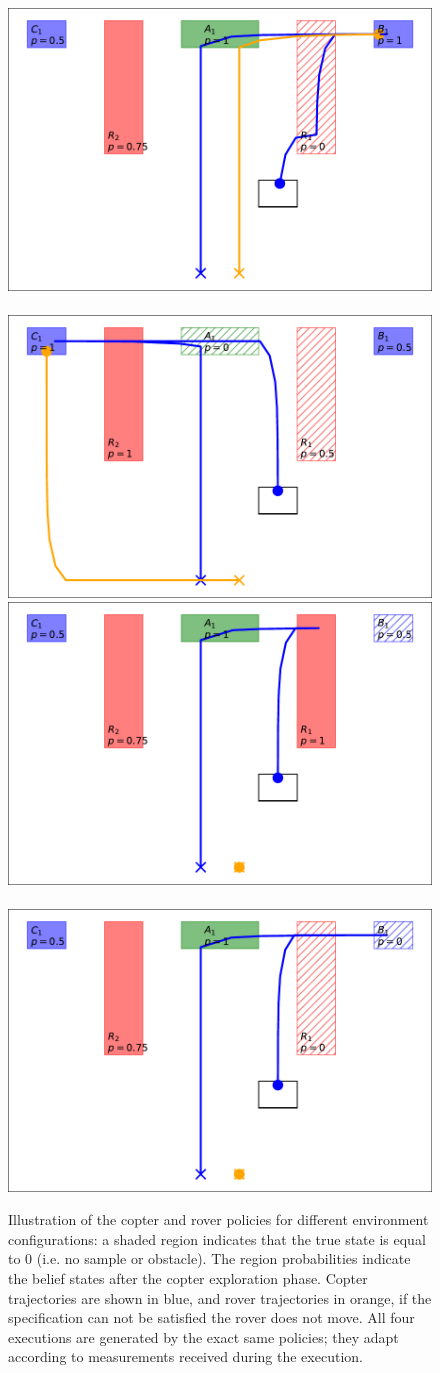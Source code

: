 \documentclass[conference]{IEEEtran}
\begin{document}
\begin{figure}
	\begin{center}
	\includegraphics[width=0.4\columnwidth]{2figs/exp0-map.pdf} ~
	\includegraphics[width=0.4\columnwidth]{2figs/exp1-map.pdf} \\
	\vspace{1mm}
	\includegraphics[width=0.4\columnwidth]{2figs/exp2-map.pdf} ~
	\includegraphics[width=0.4\columnwidth]{2figs/exp3-map.pdf}
	\end{center}
	\caption{Illustration of the copter and rover policies for different environment configurations: a shaded region indicates that the true state is equal to 0 (i.e. no sample or obstacle). The region probabilities indicate the belief states after the copter exploration phase. Copter trajectories are shown in blue, and rover trajectories in orange, if the specification can not be satisfied the rover does not move. All four executions are generated by the exact same policies; they adapt according to measurements received during the execution.}
	\label{fig:copter_executions}
\end{figure}
\end{document}
